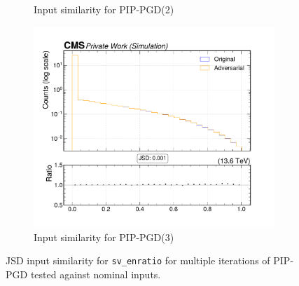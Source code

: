 \begin{figure}[htbp]
\begin{subfigure}[t]{0.32\textwidth}
    \caption*{Input similarity for PIP-PGD(2)}
  \end{subfigure}\hfill
  \begin{subfigure}[t]{0.32\textwidth}
    \includegraphics[width=\linewidth]{media/output/features/compare/combined_it_3/cmp_vtx_arr_sv_enratio.pdf}
    \caption*{Input similarity for PIP-PGD(3)}
  \end{subfigure}

  \caption*{JSD input similarity for \texttt{sv\_enratio} for multiple iterations of PIP-PGD tested against nominal inputs.}
  \label{fig:combined_input_sv_enratio}
\end{figure}

